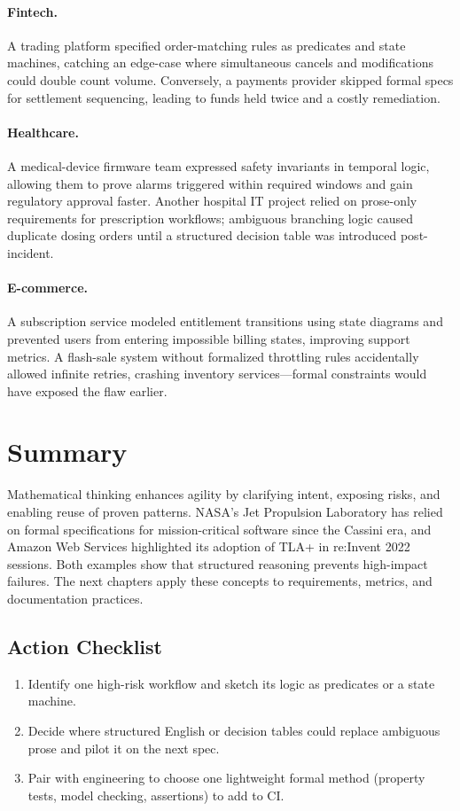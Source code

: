 \paragraph{Fintech.} A trading platform specified order-matching rules as predicates and state machines, catching an edge-case where simultaneous cancels and modifications could double count volume. Conversely, a payments provider skipped formal specs for settlement sequencing, leading to funds held twice and a costly remediation.

\paragraph{Healthcare.} A medical-device firmware team expressed safety invariants in temporal logic, allowing them to prove alarms triggered within required windows and gain regulatory approval faster. Another hospital IT project relied on prose-only requirements for prescription workflows; ambiguous branching logic caused duplicate dosing orders until a structured decision table was introduced post-incident.

\paragraph{E-commerce.} A subscription service modeled entitlement transitions using state diagrams and prevented users from entering impossible billing states, improving support metrics. A flash-sale system without formalized throttling rules accidentally allowed infinite retries, crashing inventory services—formal constraints would have exposed the flaw earlier.

\section{Summary}
\label{sec:math-rigor-summary}

Mathematical thinking enhances agility by clarifying intent, exposing risks, and enabling reuse of proven patterns. NASA’s Jet Propulsion Laboratory has relied on formal specifications for mission-critical software since the Cassini era, and Amazon Web Services highlighted its adoption of TLA+ in re:Invent 2022 sessions. Both examples show that structured reasoning prevents high-impact failures. The next chapters apply these concepts to requirements, metrics, and documentation practices.

\subsection{Action Checklist}
\begin{enumerate}
    \item Identify one high-risk workflow and sketch its logic as predicates or a state machine.
    \item Decide where structured English or decision tables could replace ambiguous prose and pilot it on the next spec.
    \item Pair with engineering to choose one lightweight formal method (property tests, model checking, assertions) to add to CI.
\end{enumerate}

